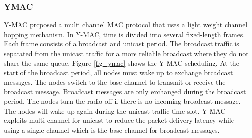 

\subsubsection{YMAC}
Y-MAC \cite{y-mac} proposed a multi channel MAC protocol that uses a light weight channel hopping mechanism. In Y-MAC, time is divided into several fixed-length frames. Each frame consists of a broadcast and unicast period. The broadcast traffic is separated from the unicast traffic for a more reliable broadcast where they do not share the same queue. Figure \ref{fig_ymac} shows the Y-MAC scheduling. At the start of the broadcast period, all nodes must wake up to exchange broadcast messages. The nodes switch to the base channel to transmit or receive the broadcast message. Broadcast messages are only exchanged during the broadcast period. The nodes turn the radio off if there is no incoming broadcast message. The nodes will wake up again during the unicast traffic time slot. Y-MAC exploits multi channel for unicast to reduce the packet delivery latency while using a single channel which is the base channel for broadcast messages.

